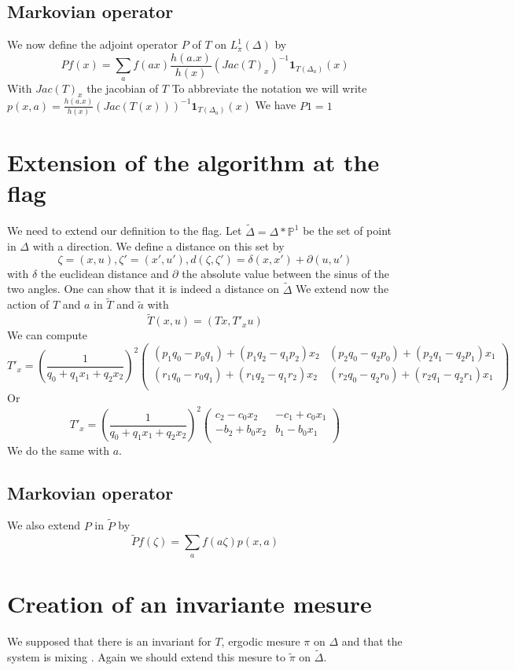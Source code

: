 \documentclass[12pt]{article}
\theoremstyle{plain}%
\theoremstyle{definition}
\theoremstyle{remark}
\begin{document}
\subsection{Markovian operator}
We now define the adjoint operator $P$ of $T$ on $L^1_{\pi}(\Delta)$ by \[
Pf(x)=\sum_{a} f(a x)\frac{h(a.x)}{h(x)}(Jac(T)_x)^{-1} \mathbf{1} _{T(\Delta_a)}(x)
\]
With $Jac(T)_x$ the jacobian of $T$\newline
To abbreviate the notation we will write $p(x,a)=\frac{h(a.x)}{h(x)}(Jac(T(x)))^{-1} \mathbf{1}_{T(\Delta_a)}(x)$\newline
We have $P1=1$

\section{Extension of the algorithm at the flag}
We need to extend our definition to the flag. Let $\tilde{\Delta}=\Delta*\mathbb{P}^1$ be the set of point in $\Delta$ with a direction. We define a distance on this set by \[
\zeta=(x,u),\zeta'=(x',u'),d(\zeta,\zeta')=\delta(x,x')+\partial (u,u')
\]
with $\delta$ the euclidean distance and $\partial$ the absolute value between the sinus of the two angles.
One can show that it is indeed a distance on $\tilde{\Delta}$\newline
We extend now the action of $T$ and $a$ in $\tilde{T}$ and $\tilde{a}$ with\[
\tilde{T}(x,u)=(Tx,T'_x u)
\]
We can compute \[
T'_x=(\frac{1}{q_0+q_1 x_1 + q_2 x_2})^2 \begin{pmatrix}
(p_1 q_0 - p_0 q_1)+(p_1 q_2-q_1 p_2)x_2 & (p_2 q_0-q_2 p_0)+(p_2 q_1 -q_2 p_1) x_1 \\
(r_1 q_0 - r_0 q_1)+(r_1 q_2-q_1 r_2)x_2 & (r_2 q_0-q_2 r_0)+(r_2 q_1 -q_2 r_1) x_1 \\
\end{pmatrix}
\]
Or \[
T'_x = (\frac{1}{q_0+q_1 x_1 + q_2 x_2})^2 \begin{pmatrix}
c_2-c_0 x_2 & -c_1+c_0 x_1 \\
-b_2+b_0 x_2 & b_1 - b_0 x_1 \\
\end{pmatrix}
\]
We do the same with $a$.
\subsection{Markovian operator}
We also extend $P$ in $\tilde{P}$ by \[
\tilde{P}f(\zeta)=\sum_a f(a \zeta) p(x,a)
\]

\section{Creation of an invariante mesure}
We supposed that there is an invariant for $T$, ergodic mesure $\pi$ on $\Delta$ and that the system is mixing %
. Again we should extend this mesure to $\tilde{\pi}$ on $\tilde{\Delta}$.\newline
\end{document}
